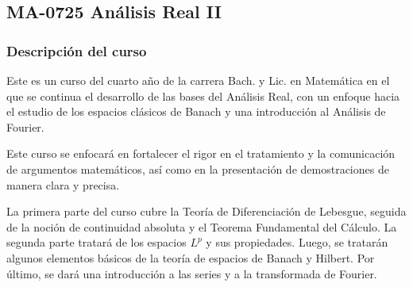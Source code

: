 \newpage
\subsection*{MA-0725 Análisis Real II}

\hypertarget{MA0725}{}
\begin{refsection}
\begin{table}[H]
\end{table}



\subsubsection*{Descripción del curso}

Este es un curso del cuarto año de la carrera Bach. y Lic. en Matemática en el que se continua el desarrollo de las bases del Análisis Real, con un enfoque hacia el estudio de los espacios clásicos de Banach y una introducción al Análisis de Fourier.

Este curso se enfocará en fortalecer el rigor en el tratamiento y la comunicación de argumentos matemáticos, así como en la presentación de demostraciones de manera clara y precisa.

La primera parte del curso cubre la Teoría de Diferenciación de Lebesgue, seguida de la noción de continuidad absoluta y el Teorema Fundamental del Cálculo. La segunda parte tratará de los espacios $L^p$ y sus propiedades. Luego, se tratarán algunos elementos básicos de la teoría de espacios de Banach y Hilbert. Por último, se dará una introducción a las series y a la transformada de Fourier.


\end{refsection}
